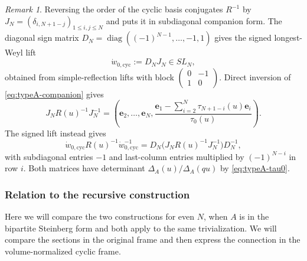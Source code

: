 \documentclass[11pt,leqno]{amsart}
\numberwithin{equation}{section}
\theoremstyle{plain}
\theoremstyle{definition}
\theoremstyle{plain}
\theoremstyle{definition}
\theoremstyle{remark}
\newtheorem{remark}[theorem]{Remark}
\begin{document}
\begin{remark}
Reversing the order of the cyclic basis conjugates $R^{-1}$ by $J_N=(\delta_{i,N+1-j})_{1\le i,j\le N}$ and puts it in subdiagonal companion form. The diagonal sign matrix $D_N=\operatorname{diag}((-1)^{N-1},\ldots,-1,1)$ gives the signed longest-Weyl lift
\begin{equation}\label{eq:typeA-signed-longest-lift}
 \dot w_{0,\mathrm{cyc}}:=D_NJ_N\in SL_N,
\end{equation}
obtained from simple-reflection lifts with block $\left(\begin{smallmatrix}0&-1\\1&0\end{smallmatrix}\right)$. Direct inversion of \eqref{eq:typeA-companion} gives
\begin{equation}\label{eq:typeA-standard-companion}
 J_NR(u)^{-1}J_N^{-1}
 =\left(\mathbf e_2,\ldots,\mathbf e_N,
 \frac{\mathbf e_1-\sum_{i=2}^N\tau_{N+1-i}(u)\mathbf e_i}{\tau_0(u)}\right).
\end{equation}
The signed lift instead gives
\begin{equation}\label{eq:typeA-signed-companion}
 \dot w_{0,\mathrm{cyc}}R(u)^{-1}\dot w_{0,\mathrm{cyc}}^{-1}
 =D_N\bigl(J_NR(u)^{-1}J_N^{-1}\bigr)D_N^{-1},
\end{equation}
with subdiagonal entries $-1$ and last-column entries multiplied by $(-1)^{N-i}$ in row $i$. Both matrices have determinant $\Delta_A(u)/\Delta_A(qu)$ by \eqref{eq:typeA-tau0}.
\end{remark}

\subsubsection{Relation to the recursive construction}

Here we will compare the two constructions for even $N$, when $A$ is in the bipartite Steinberg form and both apply to the same trivialization. We will compare the sections in the original frame and then express the connection in the volume-normalized cyclic frame.
\end{document}
